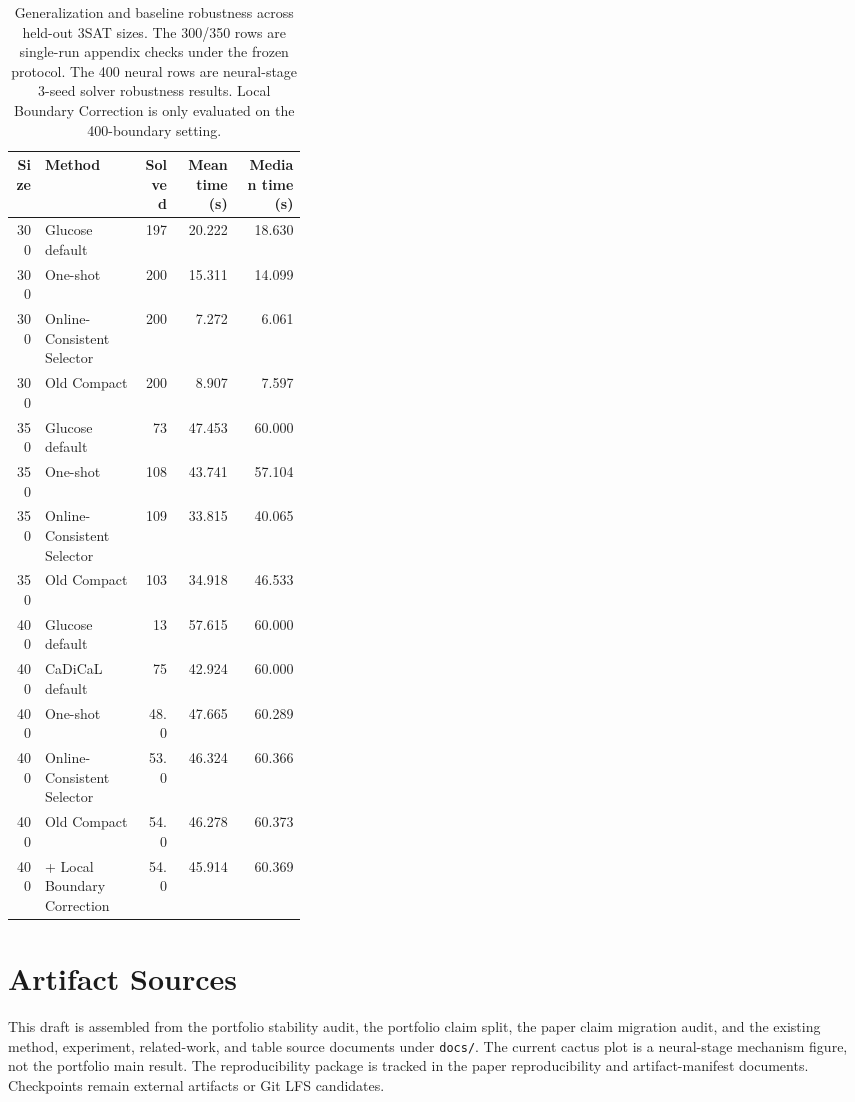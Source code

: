 \documentclass[11pt]{article}
\begin{document}
\begin{table}[h]
\centering
\caption{Generalization and baseline robustness across held-out 3SAT sizes. The 300/350 rows are single-run appendix checks under the frozen protocol. The 400 neural rows are neural-stage 3-seed solver robustness results. Local Boundary Correction is only evaluated on the 400-boundary setting.}
\label{tab:generalization-baseline}
\begin{tabular}{rp{0.34\linewidth}rrr}
\toprule
Size & Method & Solved & Mean time (s) & Median time (s) \\
\midrule
300 & Glucose default & 197 & 20.222 & 18.630 \\
300 & One-shot & 200 & 15.311 & 14.099 \\
300 & Online-Consistent Selector & 200 & 7.272 & 6.061 \\
300 & Old Compact & 200 & 8.907 & 7.597 \\
350 & Glucose default & 73 & 47.453 & 60.000 \\
350 & One-shot & 108 & 43.741 & 57.104 \\
350 & Online-Consistent Selector & 109 & 33.815 & 40.065 \\
350 & Old Compact & 103 & 34.918 & 46.533 \\
400 & Glucose default & 13 & 57.615 & 60.000 \\
400 & CaDiCaL default & 75 & 42.924 & 60.000 \\
400 & One-shot & 48.0 & 47.665 & 60.289 \\
400 & Online-Consistent Selector & 53.0 & 46.324 & 60.366 \\
400 & Old Compact & 54.0 & 46.278 & 60.373 \\
400 & + Local Boundary Correction & 54.0 & 45.914 & 60.369 \\
\bottomrule
\end{tabular}
\end{table}

\section{Artifact Sources}

This draft is assembled from the portfolio stability audit, the portfolio claim split, the paper claim migration audit, and the existing method, experiment, related-work, and table source documents under \texttt{docs/}. The current cactus plot is a neural-stage mechanism figure, not the portfolio main result. The reproducibility package is tracked in the paper reproducibility and artifact-manifest documents. Checkpoints remain external artifacts or Git LFS candidates.



\end{document}
